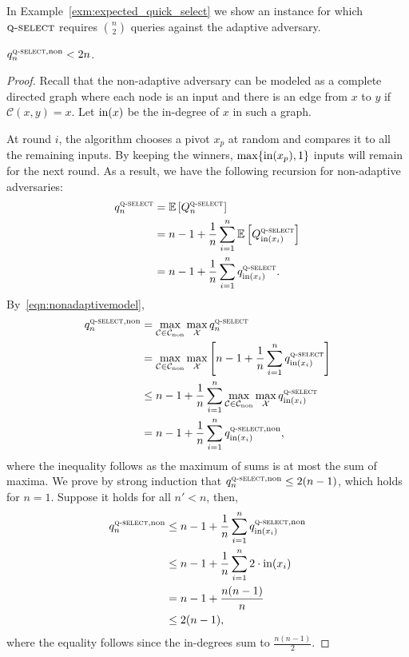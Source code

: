 \documentclass[twoside,11pt]{article}
\newcommand{\cC}{\mathcal{C}}
\newcommand{\cX}{\mathcal{X}}
\newcommand{\EE}{\mathbb{E}}
\newcommand{\algorithms}[1]{\textsc{#1}}
\newcommand{\algquickselect}{\algorithms{q-select}}
\newcommand{\din}{\textnormal{in}}
\newcommand{\nonadaptivecomp}{\cC_{\textnormal{non}}}
\newcommand{\nonadaptive}{\textnormal{non}}
\begin{document}
In Example~\ref{exm:expected_quick_select} we show an instance for which $\algquickselect$ requires
$\binom{n}{2}$ queries against the adaptive adversary.  
\begin{lemma}
 \label{lem:expected_quick_select}
 $q_n^{\algquickselect,\nonadaptive} < 2n$.
\end{lemma}
\begin{proof}
Recall that the non-adaptive adversary can be modeled as a complete
directed graph where each node is an input and there is an edge from
$x$ to $y$ if $\cC(x,y)=x$. Let $\din(x)$ be the in-degree of $x$ in
such a graph.

At round $i$, the algorithm chooses a pivot $x_p$ at random and
compares it to all the remaining inputs. By keeping the winners,
$\max\{\din(x_p),1\}$ inputs will remain for the next round. As a
result, we have the following recursion for non-adaptive adversaries:
\begin{align*}
 q_n^{\algquickselect}&=\EE\left[Q_n^{\algquickselect}\right]\\
 &= n-1+\frac{1}{n}\sum_{i=1}^{n} \EE\left[Q_{\din(x_i)}^{\algquickselect}\right]\\
 &=n-1+\frac{1}{n}\sum_{i=1}^{n} q_{\din(x_i)}^{\algquickselect}.
\end{align*}
By~\eqref{eqn:nonadaptivemodel},
\begin{align}
 \label{eqn:lem_expected}
  q_n^{\algquickselect,\nonadaptive}&=\max_{\cC\in\nonadaptivecomp}\max_{\cX} q_n^{\algquickselect}\\
 \nonumber
&=\max_{\cC\in\nonadaptivecomp}\max_{\cX} \left[n-1+\frac{1}{n}\sum_{i=1}^{n} q_{\din(x_i)}^{\algquickselect}\right]\\
 \nonumber
 &\le n-1+\frac{1}{n}\sum_{i=1}^{n} \max_{\cC\in\nonadaptivecomp}\max_{\cX} q_{\din(x_i)}^{\algquickselect}\\
 \nonumber
 &=n-1+\frac{1}{n}\sum_{i=1}^{n} q_{\din(x_i)}^{\algquickselect,\nonadaptive},
\end{align}
where the inequality follows as the maximum of sums is at most the sum of maxima. We prove by strong induction that
$q_n^{\algquickselect,\nonadaptive}\le 2(n-1)$, which holds for $n=1$. Suppose it holds for all
$n'<n$, then,
 \begin{align*}
  q_n^{\algquickselect,\nonadaptive}&\le n-1+\frac{1}{n}\sum_{i=1}^{n} q_{\din(x_i)}^{\algquickselect,\nonadaptive}\\
  &\le n-1+\frac{1}{n} \sum_{i=1}^{n} 2\cdot \din(x_i)\\
  &=n-1+\frac{n(n-1)}{n}\\
  &\le2(n-1),
 \end{align*}
where the equality follows since the in-degrees sum to $\frac{n(n-1)}{2}$.
\end{proof}
\end{document}
